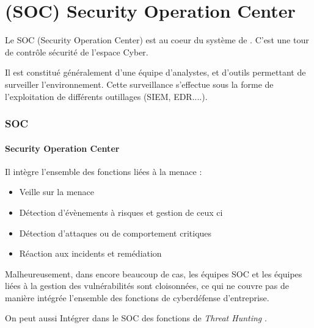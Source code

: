 
\section{(SOC) Security Operation Center}

Le SOC (Security Operation Center) est au coeur du système de . C'est une tour de contrôle sécurité de l'espace Cyber.

Il est constitué généralement d'une équipe d'analystes, et d'outils permettant de surveiller l'environnement. Cette surveillance s'effectue sous la forme de l'exploitation de différents outillages (SIEM, EDR....).


\begin{frame}
\frametitle<presentation>{SOC}
\framesubtitle<presentation>{Security Operation Center}

Il intègre l'ensemble des fonctions liées à la menace :

\begin{itemize}
  \item Veille sur la menace
  \item Détection d'évènements à risques et gestion de ceux ci
  \item Détection d'attaques ou de comportement critiques
  \item Réaction aux incidents et remédiation
\end{itemize}

\end{frame}

Malheureusement, dans encore beaucoup de cas, les équipes SOC et les équipes liées à la gestion des vulnérabilités sont cloisonnées, ce qui ne couvre pas de manière intégrée l'ensemble des fonctions de cyberdéfense d'entreprise.

On peut aussi Intégrer dans  le SOC des fonctions de  \textit{Threat Hunting }.

